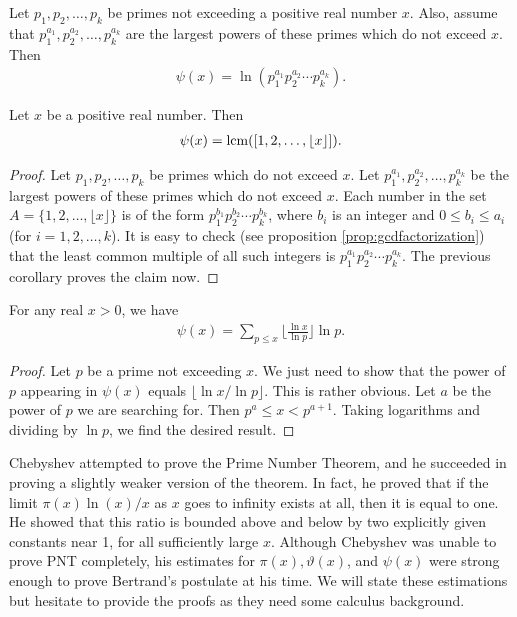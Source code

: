 	\begin{corollary}
		Let $p_1, p_2, \ldots, p_k$ be primes not exceeding a positive real number $x$. Also, assume that $p_1^{a_1}, p_2^{a_2}, \ldots, p_k^{a_k}$ are the largest powers of these primes which do not exceed $x$. Then
			\begin{align*}
				\psi(x)=\ln \left( p_1^{a_1} p_2^{a_2} \cdots p_k^{a_k} \right).
			\end{align*}
	\end{corollary}
	
	\begin{corollary}
		Let $x$ be a positive real number. Then
			\begin{align*}
				\psi(x) = \operatorname{lcm}([1, 2, \ldots, \lfloor x \rfloor]).
			\end{align*}
	\end{corollary}
	
	\begin{proof}
		Let $p_1, p_2, \ldots, p_k$ be primes which do not exceed $x$. Let $p_1^{a_1}, p_2^{a_2}, \ldots , p_k^{a_k}$ be the largest powers of these primes which do not exceed $x$. Each number in the set $A=\{1, 2, \ldots, \lfloor x \rfloor\}$ is of the form $p_1^{b_1} p_2^{b_2} \cdots p_k^{b_k}$, where $b_i$ is an integer and $0 \leq b_i \leq a_i$ (for $i=1,2,\ldots,k$). It is easy to check (see proposition \eqref{prop:gcdfactorization}) that the least common multiple of all such integers is $p_1^{a_1} p_2^{a_2} \cdots p_k^{a_k}$. The previous corollary proves the claim now.
	\end{proof}
	
	\begin{proposition}
		\label{prop:chebyshevpsiinequality}
		For any real $x>0$, we have
			\begin{align*}
				\psi(x) = \sum_{p \leq x} \Big\lfloor\frac{\ln x}{\ln p} \Big\rfloor \ln p.
			\end{align*}
	\end{proposition}
	
	\begin{proof}
		Let $p$ be a prime not exceeding $x$. We just need to show that the power of $p$ appearing in $\psi(x)$ equals $\lfloor \ln x/\ln p \rfloor$. This is rather obvious. Let $a$ be the power of $p$ we are searching for. Then $p^a \leq x <p^{a+1}$. Taking logarithms and dividing by $\ln p$, we find the desired result.
	\end{proof}
	
Chebyshev attempted to prove the Prime Number Theorem, and he succeeded in proving a slightly weaker version of the theorem. In fact, he proved that if the limit $\pi(x)  \ln(x)/x$ as $x$ goes to infinity exists at all, then it is equal to one. He showed that this ratio is bounded above and below by two explicitly given constants near 1, for all sufficiently large $x$. Although Chebyshev was unable to prove PNT completely, his estimates for $\pi(x), \vartheta(x)$, and $\psi(x)$ were strong enough to prove Bertrand's postulate at his time. We will state these estimations but hesitate to provide the proofs as they need some calculus background.

